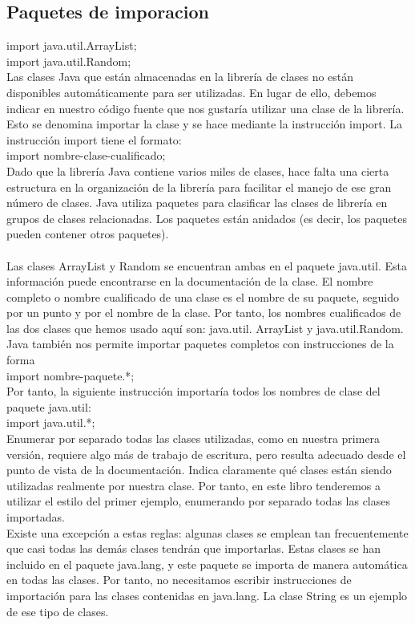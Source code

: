 \documentclass[11pt,a4paper]{article}
\begin{document}
\subsection{Paquetes de imporacion}	

	import java.util.ArrayList;\\
	import java.util.Random;\\
	Las clases Java que están almacenadas en la librería de clases no están disponibles automáticamente
	para ser utilizadas. En lugar de ello,
	debemos indicar en nuestro código fuente que nos gustaría utilizar una clase de la librería. Esto
	se denomina importar la clase y se hace mediante la instrucción import. La instrucción import
	tiene el formato:\\
	import nombre-clase-cualificado;\\
	Dado que la librería Java contiene varios miles de clases, hace falta una cierta estructura en la organización
	de la librería para facilitar el manejo de ese gran número de clases. Java utiliza paquetes
	para clasificar las clases de librería en grupos de clases relacionadas. Los paquetes están anidados
	(es decir, los paquetes pueden contener otros paquetes).
	\\
	\\
	Las clases ArrayList y Random se encuentran ambas en el paquete java.util. Esta información
	puede encontrarse en la documentación de la clase. El nombre completo o nombre cualificado
	de una clase es el nombre de su paquete, seguido por un punto y por el nombre de la clase.
	Por tanto, los nombres cualificados de las dos clases que hemos usado aquí son: java.util.
	ArrayList y java.util.Random.\\
	Java también nos permite importar paquetes completos con instrucciones de la forma\\
	import nombre-paquete.*;\\
	Por tanto, la siguiente instrucción importaría todos los nombres de clase del paquete java.util:\\
	import java.util.*;\\
	Enumerar por separado todas las clases utilizadas, como en nuestra primera versión, requiere algo
	más de trabajo de escritura, pero resulta adecuado desde el punto de vista de la documentación.
	Indica claramente qué clases están siendo utilizadas realmente por nuestra clase. Por tanto, en este
	libro tenderemos a utilizar el estilo del primer ejemplo, enumerando por separado todas las clases
	importadas.\\
	Existe una excepción a estas reglas: algunas clases se emplean tan frecuentemente que casi todas
	las demás clases tendrán que importarlas. Estas clases se han incluido en el paquete java.lang,
	y este paquete se importa de manera automática en todas las clases. Por tanto, no necesitamos
	escribir instrucciones de importación para las clases contenidas en java.lang. La clase String
	es un ejemplo de ese tipo de clases.
\end{document}
